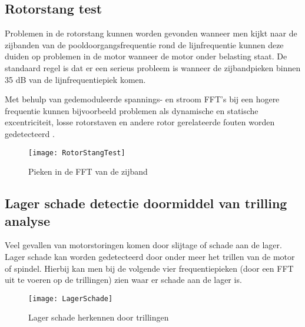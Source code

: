 \subsection{Rotorstang test}

Problemen in de rotorstang kunnen worden gevonden wanneer men kijkt naar de zijbanden van de pooldoorgangsfrequentie rond de lijnfrequentie kunnen deze duiden op problemen in de motor wanneer de motor onder belasting staat. De standaard regel is dat er een serieus probleem is wanneer de zijbandpieken binnen 35 \gls{dB} van de lijnfrequentiepiek komen. 

\vspace{0.5cm}

Met behulp van gedemoduleerde spannings- en stroom \gls{FFT}’s bij een hogere frequentie kunnen bijvoorbeeld problemen als dynamische en statische excentriciteit, losse rotorstaven en andere rotor gerelateerde fouten worden gedetecteerd \cite{web:MCSA}. 

\begin{figure}[H]
	\centering
	\texttt{[image: RotorStangTest]}
	\label{fig:RotorStangTest}
	\caption{Pieken in de \gls{FFT} van de zijband \cite{web:MCSA}}
\end{figure}

\newpage

\subsection{Lager schade detectie doormiddel van trilling analyse}

Veel gevallen van motorstoringen komen door slijtage of schade aan de lager. Lager schade kan worden gedetecteerd door onder meer het trillen van de motor of spindel. Hierbij kan men bij de volgende vier frequentiepieken (door een \gls{FFT} uit te voeren op de trillingen) zien waar er schade aan de lager is. \cite{web:BearingFault}

\begin{figure}[H]
	\centering
	\texttt{[image: LagerSchade]}
	\label{fig:LagerSchade}
	\caption{Lager schade herkennen door trillingen \cite{web:BearingFault}}
\end{figure}

